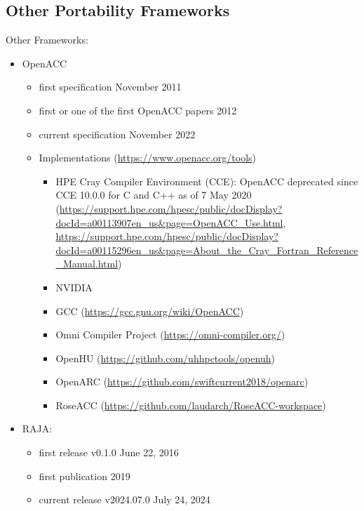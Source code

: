 \subsection{Other Portability Frameworks}
\label{sec:frameworks:other}

Other Frameworks:
\begin{itemize}
    \item OpenACC
    \begin{itemize}
        \item first specification November 2011~\cite{openacc_standard_openacc_2011}
        \item first or one of the first OpenACC papers 2012~\cite{hutchison_openacc_2012}
        \item current specification November 2022~\cite{openacc_standard_openacc_2022}
        \item Implementations (\url{https://www.openacc.org/tools})
        \begin{itemize}
            \item HPE Cray Compiler Environment (CCE): OpenACC deprecated since CCE 10.0.0 for C and C++ as of 7 May 2020 (\url{https://support.hpe.com/hpesc/public/docDisplay?docId=a00113907en_us&page=OpenACC_Use.html}, \url{https://support.hpe.com/hpesc/public/docDisplay?docId=a00115296en_us&page=About_the_Cray_Fortran_Reference_Manual.html})
            \item NVIDIA
            \item GCC (\url{https://gcc.gnu.org/wiki/OpenACC})
            \item Omni Compiler Project (\url{https://omni-compiler.org/})
            \item OpenHU (\url{https://github.com/uhhpctools/openuh})
            \item OpenARC (\url{https://github.com/swiftcurrent2018/openarc})
            \item RoseACC (\url{https://github.com/laudarch/RoseACC-workspace})
        \end{itemize}
    \end{itemize}
    
    \item RAJA:
    \begin{itemize}
        \item first release v0.1.0 June 22, 2016~\cite{llnl_release_2016}
        \item first publication 2019~\cite{beckingsale_raja_2019}
        \item current release v2024.07.0 July 24, 2024~\cite{llnl_release_2024}
    \end{itemize}


\end{itemize}
